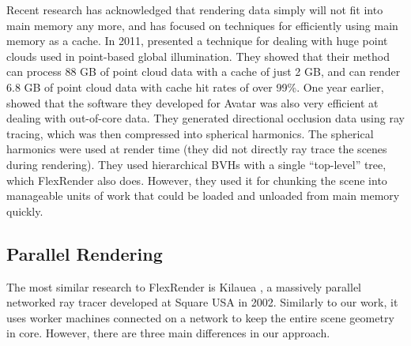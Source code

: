 \documentclass[a4paper,twoside]{article}
\begin{document}
Recent research has acknowledged that rendering data simply will not fit into
main memory any more, and has focused on techniques for efficiently using main
memory as a cache. In 2011, \cite{tabellion:2011} presented a technique for
dealing with huge point clouds used in point-based global illumination. They
showed that their method can process 88 GB of point cloud data with a cache of
just 2 GB, and can render 6.8 GB of point cloud data with cache hit rates of
over 99\%. One year earlier, \cite{pantaleoni:2010} showed that the software
they developed for Avatar was also very efficient at dealing with out-of-core
data. They generated directional occlusion data using ray tracing, which was then
compressed into spherical harmonics. The spherical harmonics were used at render
time (they did not directly ray trace the scenes during rendering). They used
hierarchical BVHs with a single ``top-level'' tree, which FlexRender also does.
However, they used it for chunking the scene into manageable units of work that
could be loaded and unloaded from main memory quickly.

\subsection{Parallel Rendering}
\label{parallelbg}

The most similar research to FlexRender is Kilauea \cite{kato:2002}, a massively
parallel networked ray tracer developed at Square USA in 2002. Similarly to our
work, it uses worker machines connected on a network to keep the entire scene
geometry in core. However, there are three main differences in our approach.
\end{document}
